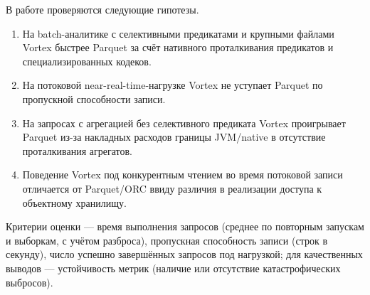 В работе проверяются следующие гипотезы.

\begin{enumerate}
    \item На batch-аналитике с селективными предикатами и крупными файлами Vortex
        быстрее Parquet за счёт нативного проталкивания предикатов и
        специализированных кодеков.
    \item На потоковой near-real-time-нагрузке Vortex не уступает Parquet по
        пропускной способности записи.
    \item На запросах с агрегацией без селективного предиката Vortex проигрывает
        Parquet из-за накладных расходов границы JVM/native в отсутствие
        проталкивания агрегатов.
    \item Поведение Vortex под конкурентным чтением во время потоковой записи
        отличается от Parquet/ORC ввиду различия в реализации доступа к объектному
        хранилищу.
\end{enumerate}

Критерии оценки --- время выполнения запросов (среднее по повторным запускам и
выборкам, с учётом разброса), пропускная способность записи (строк в секунду), число
успешно завершённых запросов под нагрузкой; для качественных выводов ---
устойчивость метрик (наличие или отсутствие катастрофических выбросов).
